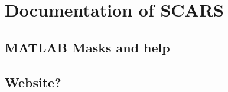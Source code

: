 \section{Documentation of SCARS}\label{sec:documentation}
\subsection{MATLAB Masks and help}
\subsection{Website?}
